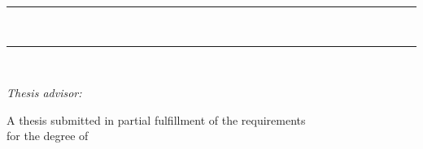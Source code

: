 \begin{titlepage}
\centering
\vspace*{1cm}

{\scshape\Large \thesisuniversity \par}
\vspace{0.3cm}
{\large \thesisfaculty \par}
\vspace{0.5cm}
{\scshape \thesisprogram \par}
\vspace{2.5cm}

\rule{\linewidth}{0.4pt}\\[0.4cm]
{\huge\bfseries \thesistitle \par}
\vspace{0.4cm}
{\Large \thesissubtitle \par}
\rule{\linewidth}{0.4pt}\\[1.5cm]

{\Large\itshape \thesisauthor \par}
\vspace{2cm}

\begin{flushright}
\textit{Thesis advisor:}\\
\thesisadvisor
\end{flushright}

\vfill
{\large A thesis submitted in partial fulfillment of the requirements\\
for the degree of \thesisprogram \par}
\vspace{1cm}
{\large \thesisyear \par}

\end{titlepage}
\clearpage
